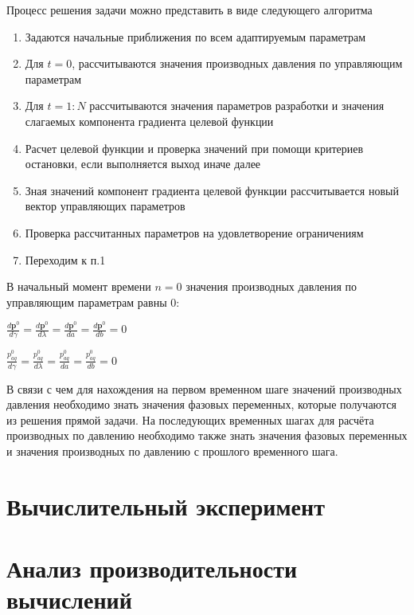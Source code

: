\documentclass[14pt]{article}
\begin{document}
Процесс решения задачи можно представить в виде следующего алгоритма

\begin{enumerate}
	\item Задаются начальные приближения по всем адаптируемым параметрам
	\item Для $ t=0 $, рассчитываются значения производных давления по управляющим параметрам
	\item Для $ t=1:N $ рассчитываются значения параметров разработки и значения слагаемых компонента градиента целевой функции
	\item Расчет целевой функции и проверка значений при помощи критериев остановки, если выполняется выход иначе далее
	\item Зная значений компонент градиента целевой функции рассчитывается новый вектор управляющих параметров
	\item Проверка рассчитанных параметров на удовлетворение ограничениям
	\item Переходим к п.1
\end{enumerate}

В начальный момент времени $ n=0 $ значения производных давления по управляющим параметрам равны 0:

$\frac{d\boldsymbol{p}^0}{d\gamma} = \frac{d\boldsymbol{p}^0}{d\lambda} = \frac{d\boldsymbol{p}^0}{da} = \frac{d\boldsymbol{p}^0}{db} = 0$

$\frac{p_{aq}^0}{d\gamma} = \frac{p_{aq}^0}{d\lambda} = \frac{p_{aq}^0}{da} = \frac{p_{aq}^0}{db} = 0$

В связи с чем для нахождения на первом временном шаге значений производных давления необходимо знать значения фазовых переменных, которые получаются из решения прямой задачи. На последующих временных шагах для расчёта производных по давлению необходимо также знать значения фазовых переменных и значения производных по давлению с прошлого временного шага.

\section{Вычислительный эксперимент}

\section{Анализ производительности вычислений}

\newpage
\end{document}
